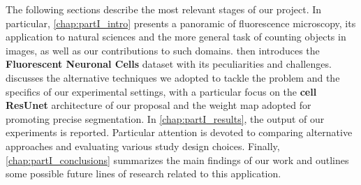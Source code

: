 The following sections describe the most relevant stages of our project.
In particular, \cref{chap:partI_intro} presents a panoramic of fluorescence microscopy, its application to natural sciences and the more general task of counting objects in images, as well as our contributions to such domains.
 then introduces the \textbf{Fluorescent Neuronal Cells} dataset with its peculiarities and challenges.
 discusses the alternative techniques we adopted to tackle the problem and the specifics of our experimental settings, with a particular focus on the \textbf{cell ResUnet} architecture of our proposal and the weight map adopted for promoting precise segmentation.
In \cref{chap:partI_results}, the output of our experiments is reported. Particular attention is devoted to comparing alternative approaches and evaluating various study design choices.
Finally, \cref{chap:partI_conclusions} summarizes the main findings of our work and outlines some possible future lines of research related to this application.